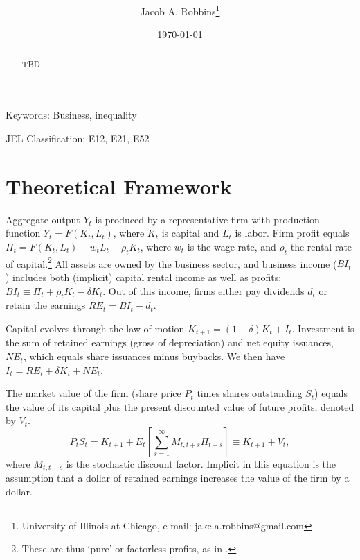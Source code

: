 \documentclass[12pt]{article}
\newcommand{\be}{\begin{equation}}
\newcommand{\ee}{\end{equation}}
\begin{document}
\title{ }
%
\author {Jacob A. Robbins\footnote{\baselineskip=11pt University of Illinois at Chicago, e-mail: jake.a.robbins@gmail.com}  }

\date{\today}
 \maketitle
\thispagestyle{empty}
 

 \begin{abstract}  
TBD



\end{abstract}

\vspace{50pt}
Keywords: Business, inequality

\vspace{0pt}
JEL Classification: E12, E21, E52
\vspace{10pt}

\pagebreak
\addtocounter{page}{-1}

\newpage
 
 \thispagestyle{fancy}
 
\section{Theoretical Framework}

Aggregate output $Y_t$ is produced by a representative firm with production function $Y_t = F(K_t,L_t)$, where $K_t$ is capital and $L_t$ is labor. Firm profit equals $\Pi_t = F(K_t,L_t) - w_t L_t - \rho_t K_t$, where $w_t$ is the wage rate, and $\rho_t$ the rental rate of capital.\footnote{These are thus `pure' or factorless profits, as in \citet{karabarbounis2019accounting}.} All assets are owned by the business sector, and business income ($BI_t$) includes both (implicit) capital rental income as well as profits: $BI_t \equiv \Pi_t + \rho_t K_t - \delta K_t$. Out of this income, firms either pay dividends $d_t$ or retain the earnings $RE_t = BI_t - d_t$. 

Capital evolves through the law of motion $K_{t+1} = (1-\delta) K_t + I_t$. Investment is the sum of retained earnings (gross of depreciation) and net equity issuances, $NE_t$, which equals share issuances minus buybacks. We then have $I_t = RE_t + \delta K_t + NE_t$. 

The market value of the firm (share price $P_t$ times shares outstanding $S_t$) equals the value of its capital plus the present discounted value of future profits, denoted by $V_t$.
\be
\label{eq:pdef}
P_t S_t = K_{t+1} + E_t[\sum_{s=1}^{\infty} M_{t,t+s} \Pi_{t+s}] \equiv K_{t+1} + V_t,
\ee
where $M_{t,t+s}$ is the stochastic discount factor. Implicit in this equation is the \citet{miller1961dividend} assumption that a dollar of retained earnings increases the value of the firm by a dollar.
\end{document}
